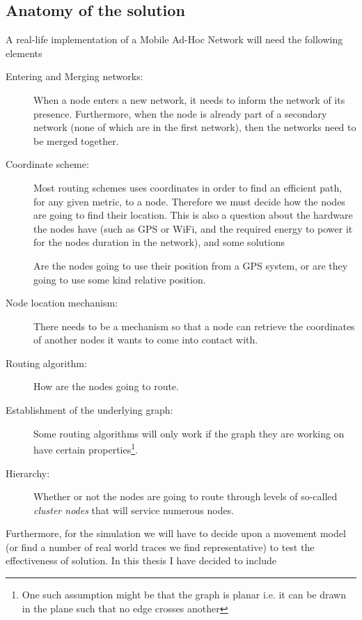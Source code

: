 \subsection{Anatomy of the solution}

A real-life implementation of a Mobile Ad-Hoc Network will need the following elements

\begin{description}
\item[Entering and Merging networks:] When a node enters a new network, it needs to inform the network of its presence. Furthermore, when the node is already part of a secondary network (none of which are in the first network), then the networks need to be merged together.  
\item[Coordinate scheme:] Most routing schemes uses coordinates in order to find an efficient path, for any given metric, to a node. Therefore we must decide how the nodes are going to find their location. This is also a question about the hardware the nodes have (such as GPS or WiFi, and the required energy to power it for the nodes duration in the network), and some solutions   

Are the nodes going to use their position from a GPS system, or are they going to use some kind relative position.
\item[Node location mechanism:] There needs to be a mechanism so that a node can retrieve the coordinates of another nodes it wants to come into contact with. 
\item[Routing algorithm:] How are the nodes going to route. 
\item[Establishment of the underlying graph:]  Some routing algorithms will only work if the graph they are working on have certain properties\footnote{One such assumption might be that the graph is planar i.e. it can be drawn in the plane such that no edge crosses another}.
\item[Hierarchy:] Whether or not the nodes are going to route through levels of so-called \emph{cluster nodes} that will service numerous nodes.
\end{description} 

Furthermore, for the simulation we will have to decide upon a movement model (or find a number of real world traces we find representative) to test the effectiveness of solution. In this thesis I have decided to include 

